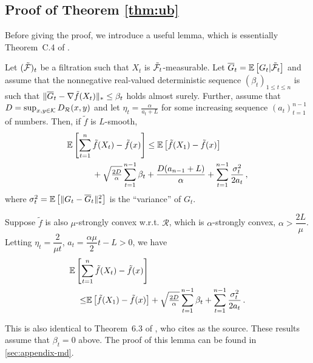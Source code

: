 \subsection{Proof of Theorem \ref{thm:ub}}
\label{sec:ub-proof}

Before giving the proof, we introduce a useful lemma, which is essentially Theorem~C.4 of \cite{MahdaviPhd:2014}.
\begin{lemma}
\label{lem:ub}
Let $({\tilde{\mathcal{F}}})_{t}$ be a filtration such that $X_t$ is ${\tilde{\mathcal{F}}}_t$-measurable.
Let $\overline G_t = \mathbb{E}\left[G_t|{\tilde{\mathcal{F}}}_t\right]$ 
and assume that the nonnegative real-valued deterministic sequence $(\beta_t)_{1\le t\le n}$ is such that 
$\|\overline G_t - \nabla \tilde{f}(X_t)\|_* \le \beta_t$ holds almost surely. 
Further, assume that $D=\sup_{x,y\in \mathcal{K}} D_{\mathcal{R}}(x,y)$ and let $\eta_t = \frac{\alpha}{a_t+L}$ for some increasing 
sequence $(a_t)_{t=1}^{n-1}$ of numbers. Then, if $\tilde{f}$ is $L$-smooth,
\begin{align*}
& \mathbb{E}\left[ \sum_{t=1}^n \tilde{f}(X_t) - \tilde{f}(x) \right]  \le 	 \mathbb{E}\left[\tilde{f}(X_1)-\tilde{f}(x)\right] \\
 &\quad\qquad +\sqrt{\tfrac{2D}{\alpha}} \sum_{t=1}^{n-1} \beta_t 
 +\frac{D(a_{n-1}+L)}{\alpha} +
	  \sum_{t=1}^{n-1}\frac{\sigma_t^2}{2a_t}\,,
\end{align*}
where $\sigma_t^2 = \mathbb{E}\left[ \|G_t-\overline G_t\|_*^2\right]$ is the ``variance'' of $G_t$.

Suppose ${\tilde{f}}$ is also $\mu$-strongly convex w.r.t. $\mathcal{R}$, which is $\alpha$-strongly convex, $\alpha > \dfrac{2L}{\mu}$. Letting $\eta_t = \dfrac{2}{\mu t}$, $a_t = \dfrac{\alpha \mu}{2}t-L > 0$, we have 
\begin{align*}
\MoveEqLeft \EE{ \sum_{t=1}^n \tilde{f}(X_t) - \tilde{f}(x) }  \\
\le& 	 \EE{\tilde{f}(X_1)-\tilde{f}(x)}+ 
 \sqrt{\tfrac{2D}{\alpha}} \sum_{t=1}^{n-1} \beta_t 
 +\sum_{t=1}^{n-1}\frac{\sigma_t^2}{2a_t}\,.
\end{align*}
\end{lemma}
This is also identical to Theorem~6.3 of \cite{Bu:Convex14}, who cites \cite{Dekel:minibatch12} as the source. These results assume that $\beta_t=0$ above.
The proof of this lemma can be found in \cref{sec:appendix-md}.


